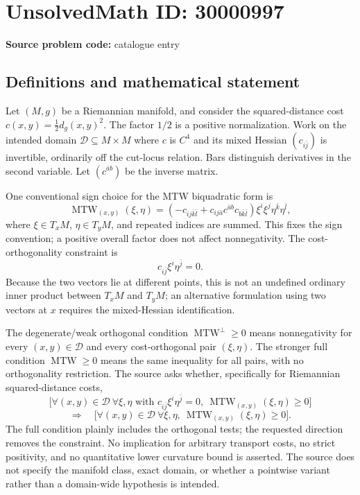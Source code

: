 \documentclass[11pt]{article}
\begin{document}
\section*{UnsolvedMath ID: 30000997}
\textbf{Source problem code:} catalogue entry
\subsection{Definitions and mathematical statement}
Let \((M,g)\) be a Riemannian manifold, and consider the squared-distance cost \(c(x,y)=\tfrac12d_g(x,y)^2\). The factor \(1/2\) is a positive normalization. Work on the intended domain \(\mathcal D\subseteq M\times M\) where \(c\) is \(C^4\) and its mixed Hessian \((c_{i\bar j})\) is invertible, ordinarily off the cut-locus relation. Bars distinguish derivatives in the second variable. Let \((c^{\bar a b})\) be the inverse matrix.

One conventional sign choice for the MTW biquadratic form is
\[
 \operatorname{MTW}_{(x,y)}(\xi,\eta)=
 \left(-c_{ij\bar k\bar l}
       +c_{ij\bar a}c^{\bar a b}c_{b\bar k\bar l}\right)
 \xi^i\xi^j\eta^{\bar k}\eta^{\bar l},
\]
where \(\xi\in T_xM\), \(\eta\in T_yM\), and repeated indices are summed. This fixes the sign convention; a positive overall factor does not affect nonnegativity. The cost-orthogonality constraint is
\[
 c_{i\bar j}\xi^i\eta^{\bar j}=0.
\]
Because the two vectors lie at different points, this is not an undefined ordinary inner product between \(T_xM\) and \(T_yM\); an alternative formulation using two vectors at \(x\) requires the mixed-Hessian identification.

The degenerate/weak orthogonal condition \(\operatorname{MTW}^{\perp}\geq0\) means nonnegativity for every \((x,y)\in\mathcal D\) and every cost-orthogonal pair \((\xi,\eta)\). The stronger full condition \(\operatorname{MTW}\geq0\) means the same inequality for all pairs, with no orthogonality restriction. The source asks whether, specifically for Riemannian squared-distance costs,
\[
 \bigl[\forall(x,y)\in\mathcal D\ \forall\xi,\eta
 \text{ with }c_{i\bar j}\xi^i\eta^{\bar j}=0,
 \ \operatorname{MTW}_{(x,y)}(\xi,\eta)\geq0\bigr]
\]
\[
 \Longrightarrow\quad
 \bigl[\forall(x,y)\in\mathcal D\ \forall\xi,\eta,
 \ \operatorname{MTW}_{(x,y)}(\xi,\eta)\geq0\bigr].
\]
The full condition plainly includes the orthogonal tests; the requested direction removes the constraint. No implication for arbitrary transport costs, no strict positivity, and no quantitative lower curvature bound is asserted. The source does not specify the manifold class, exact domain, or whether a pointwise variant rather than a domain-wide hypothesis is intended.
\end{document}
